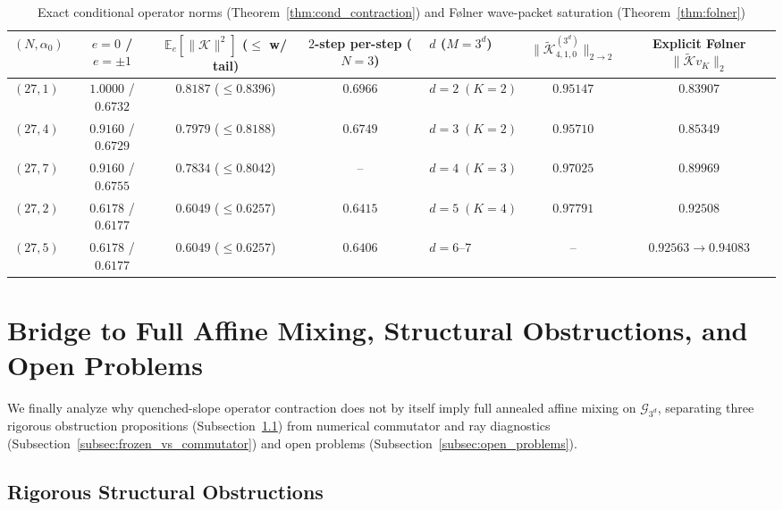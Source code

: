 \documentclass[11pt,a4paper]{article}
\numberwithin{equation}{section}
\theoremstyle{definition}
\theoremstyle{remark}
\newcommand{\E}{\mathbb{E}}
\newcommand{\cG}{\mathcal{G}}
\newcommand{\cK}{\mathcal{K}}
\begin{document}
\begin{table}[htbp]
\centering
\caption{Exact conditional operator norms (Theorem~\ref{thm:cond_contraction}) and F{\o}lner wave-packet saturation (Theorem~\ref{thm:folner})}
\label{tab:cond_folner}
\small
\setlength{\tabcolsep}{3.5pt}
\begin{tabular}{@{}lccc|lcc@{}}
\toprule
$(N, \alpha_0)$ & $e=0$ / $e=\pm 1$ & \shortstack{$\E_e[\|\cK\|^2]$\\($\le$ w/ tail)} & \shortstack{$2$-step per-step\\($N=3$)} & $d$ ($M=3^d$) & $\|\widetilde{\cK}_{4, 1, 0}^{(3^d)}\|_{2\to 2}$ & \shortstack{Explicit F{\o}lner\\$\| \widetilde{\cK} v_K \|_2$} \\
\midrule
$(27, 1)$ & $1.0000$ / $0.6732$ & $0.8187$ ($\le 0.8396$) & $0.6966$ & $d=2\;(K=2)$ & $0.95147$ & $0.83907$ \\
$(27, 4)$ & $0.9160$ / $0.6729$ & $0.7979$ ($\le 0.8188$) & $0.6749$ & $d=3\;(K=2)$ & $0.95710$ & $0.85349$ \\
$(27, 7)$ & $0.9160$ / $0.6755$ & $0.7834$ ($\le 0.8042$) & -- & $d=4\;(K=3)$ & $0.97025$ & $0.89969$ \\
$(27, 2)$ & $0.6178$ / $0.6177$ & $0.6049$ ($\le 0.6257$) & $0.6415$ & $d=5\;(K=4)$ & $0.97791$ & $0.92508$ \\
$(27, 5)$ & $0.6178$ / $0.6177$ & $0.6049$ ($\le 0.6257$) & $0.6406$ & $d=6\text{--}7$ & -- & $0.92563 \to 0.94083$ \\
\bottomrule
\end{tabular}
\end{table}

\section{Bridge to Full Affine Mixing, Structural Obstructions, and Open Problems}\label{sec:bridge}

We finally analyze why quenched-slope operator contraction does not by itself imply full annealed affine mixing on $\cG_{3^d}$, separating three rigorous obstruction propositions (Subsection~\ref{subsec:obstruction_props}) from numerical commutator and ray diagnostics (Subsection~\ref{subsec:frozen_vs_commutator}) and open problems (Subsection~\ref{subsec:open_problems}).

\subsection{Rigorous Structural Obstructions}\label{subsec:obstruction_props}
\end{document}
